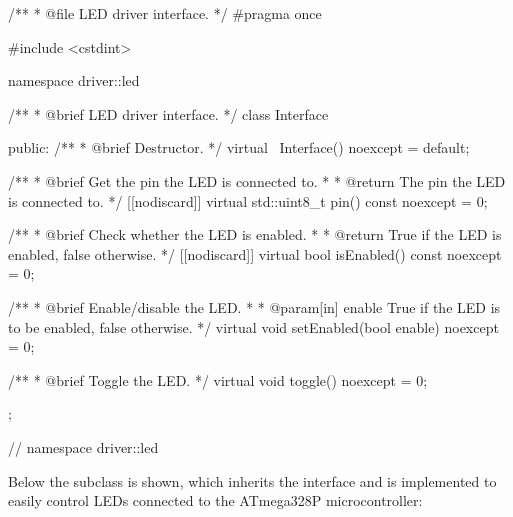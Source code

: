 \begin{cppcode}
/**
 * @file LED driver interface.
 */
#pragma once

#include <cstdint>

namespace driver::led
{
/**
 * @brief LED driver interface.
 */
class Interface
{
public:
    /**
     * @brief Destructor.
     */
    virtual ~Interface() noexcept = default;

    /**
     * @brief Get the pin the LED is connected to.
     *
     * @return The pin the LED is connected to.
     */
    [[nodiscard]] virtual std::uint8_t pin() const noexcept = 0;

    /**
     * @brief Check whether the LED is enabled.
     *
     * @return True if the LED is enabled, false otherwise.
     */
    [[nodiscard]] virtual bool isEnabled() const noexcept = 0;

    /**
     * @brief Enable/disable the LED.
     *
     * @param[in] enable True if the LED is to be enabled, false otherwise.
     */
    virtual void setEnabled(bool enable) noexcept = 0;

    /**
     * @brief Toggle the LED.
     */
    virtual void toggle() noexcept = 0;
};
} // namespace driver::led
\end{cppcode}

\noindent Below the subclass  is shown, which inherits the interface
 and is implemented to easily control LEDs connected to the ATmega328P
microcontroller:

